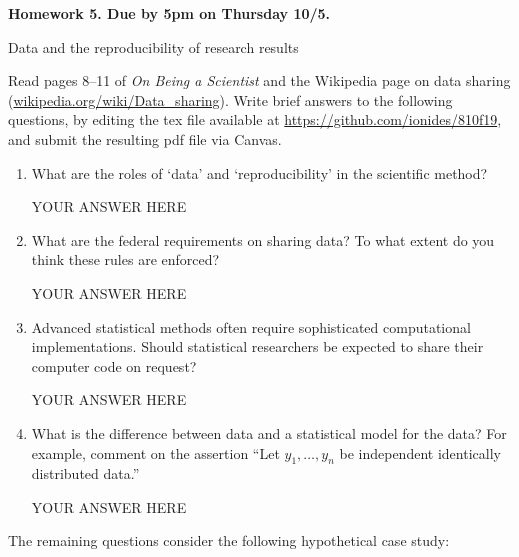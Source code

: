 \documentclass[12pt]{article}
\begin{document}
\begin{center}\bf
Homework 5. Due by 5pm on Thursday 10/5.

Data and the reproducibility of research results
\end{center}
Read pages 8--11 of {\em On Being a Scientist} and the Wikipedia page on data sharing (\url{wikipedia.org/wiki/Data_sharing}). Write brief answers to the following questions, by editing the tex file available at \url{https://github.com/ionides/810f19}, and submit the resulting pdf file via Canvas.

\begin{enumerate}

\item What are the roles of `data' and `reproducibility' in the scientific method? 

YOUR ANSWER HERE

\item What are the federal requirements on sharing data? To what extent do you think these rules are enforced?

YOUR ANSWER HERE

\item Advanced statistical methods often require sophisticated computational implementations. Should statistical researchers be expected to share their computer code on request?

YOUR ANSWER HERE

\item What is the difference between data and a statistical model for the data? For example, comment on the assertion ``Let $y_1,\dots,y_n$ be independent identically distributed data.''

YOUR ANSWER HERE
\end{enumerate}
The remaining questions consider the following hypothetical case study:
\end{document}
